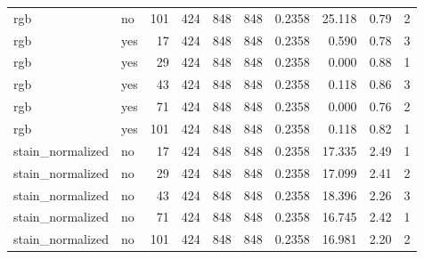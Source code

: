 \begin{longtable}{p{2.4cm}p{1.0cm}rrrrrrrr}
rgb & no & 101 & 424 & 848 & 848 & 0.2358 & 25.118 & 0.79 & 2 \\ 
rgb & yes & 17 & 424 & 848 & 848 & 0.2358 & 0.590 & 0.78 & 3 \\ 
rgb & yes & 29 & 424 & 848 & 848 & 0.2358 & 0.000 & 0.88 & 1 \\ 
rgb & yes & 43 & 424 & 848 & 848 & 0.2358 & 0.118 & 0.86 & 3 \\ 
rgb & yes & 71 & 424 & 848 & 848 & 0.2358 & 0.000 & 0.76 & 2 \\ 
rgb & yes & 101 & 424 & 848 & 848 & 0.2358 & 0.118 & 0.82 & 1 \\ 
stain\_normalized & no & 17 & 424 & 848 & 848 & 0.2358 & 17.335 & 2.49 & 1 \\ 
stain\_normalized & no & 29 & 424 & 848 & 848 & 0.2358 & 17.099 & 2.41 & 2 \\ 
stain\_normalized & no & 43 & 424 & 848 & 848 & 0.2358 & 18.396 & 2.26 & 3 \\ 
stain\_normalized & no & 71 & 424 & 848 & 848 & 0.2358 & 16.745 & 2.42 & 1 \\ 
stain\_normalized & no & 101 & 424 & 848 & 848 & 0.2358 & 16.981 & 2.20 & 2 \\ 
\end{longtable}
